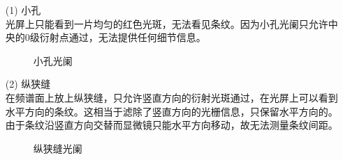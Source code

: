 \documentclass{article}
\begin{document}
    \begin{enumerate}
        \item [(1)] 小孔 \\
        光屏上只能看到一片均匀的红色光斑，无法看见条纹。因为小孔光阑只允许中央的0级衍射点通过，无法提供任何细节信息。
        \newpage
        \begin{figure}[h]
            \centering
            \caption{小孔光阑}
        \end{figure}
    
        \item [(2)] 纵狭缝 \\
        在频谱面上放上纵狭缝，只允许竖直方向的衍射光斑通过，在光屏上可以看到水平方向的条纹。这相当于滤除了竖直方向的光栅信息，只保留水平方向的。
        由于条纹沿竖直方向交替而显微镜只能水平方向移动，故无法测量条纹间距。
        \begin{figure}[h]
            \centering
            \caption{纵狭缝光阑}
        \end{figure}


\end{enumerate}
\end{document}
